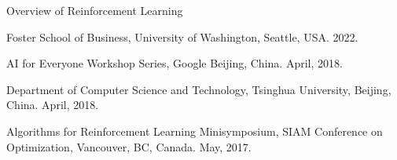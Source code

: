 \documentclass[10pt,twoside,letterpaper]{article}
\begin{document}
\begin{compactitem}
\item{Overview of Reinforcement Learning}
\begin{compactitem}
\item{Foster School of Business, University of Washington, Seattle, USA. 2022.}  %
\item{AI for Everyone Workshop Series, Google Beijing, China.  April, 2018.}
\item{Department of Computer Science and Technology, Tsinghua University, Beijing, China.  April, 2018.}
\item{Algorithms for Reinforcement Learning Minisymposium, SIAM Conference on Optimization, Vancouver, BC, Canada.  May, 2017.}
\end{compactitem}


\end{compactitem}
\end{document}
